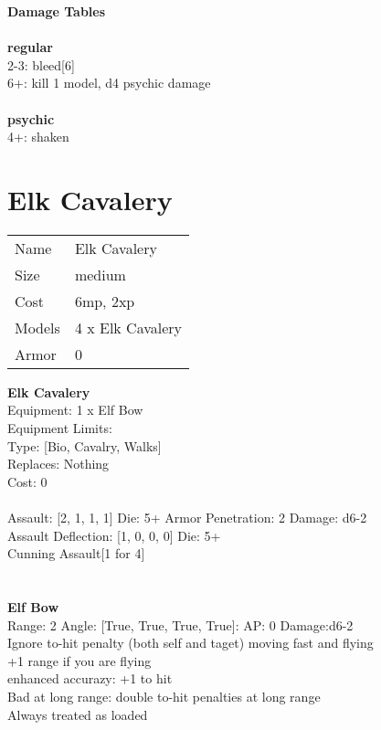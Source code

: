 {\bf Damage Tables} \\
\ \\ {\bf regular } \\
2-3: bleed[6] \\
6+: kill 1 model, d4 psychic damage \\
\ \\ {\bf psychic } \\
4+: shaken \\










\pagebreak\pagebreak

\section{ Elk Cavalery }

\begin{tabular}{ll}
  Name & Elk Cavalery \\
  Size & medium\\
  Cost & 6mp, 2xp\\
  Models & 4 x Elk Cavalery\\
  Armor & 0\\
\end{tabular}

\noindent 

{\bf Elk Cavalery } \\
Equipment: 1 x Elf Bow \\
Equipment Limits:  \\
Type: [Bio, Cavalry, Walks] \\
Replaces: Nothing \\
Cost: 0\\
\ \\
Assault: [2, 1, 1, 1] Die: 5+ Armor Penetration: 2 Damage: d6-2 \\
Assault Deflection: [1, 0, 0, 0] Die: 5+\\
\indent Cunning Assault[1 for 4]\\ 
 
\ \\

\ \\
{\bf Elf Bow } \\



Range: 2  Angle: [True, True, True, True]: AP: 0 Damage:d6-2 \\
Ignore to-hit penalty (both self and taget) moving fast and flying\\ 
+1 range if you are flying\\ 
enhanced accurazy: +1 to hit\\ 
Bad at long range: double to-hit penalties at long range\\ 
Always treated as loaded\\ 





